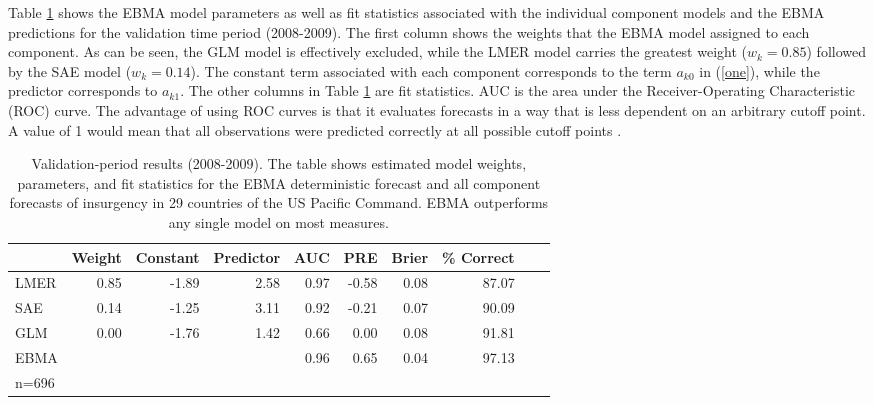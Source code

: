 \documentclass[12pt,fullpage,endnotes]{article}
\begin{document}
Table \ref{InSam1} shows the EBMA model parameters as well as fit
statistics associated with the individual component models and the
EBMA predictions for the validation time period (2008-2009). The first
column shows the weights that the EBMA model assigned to each
component. As can be seen, the GLM model is effectively excluded,
while the LMER model carries the greatest weight ($w_k=0.85$)
followed by the SAE model ($w_k = 0.14$).  The constant term
associated with each component corresponds to the term $a_{k0}$ in
(\ref{one}), while the predictor corresponds to $a_{k1}$.  The other
columns in Table \ref{InSam1} are fit statistics.  AUC is the area
under the Receiver-Operating Characteristic (ROC) curve. The advantage
of using ROC curves is that it evaluates forecasts in a way that is
less dependent on an arbitrary cutoff point.  A value of 1 would mean
that all observations were predicted correctly at all possible cutoff
points \citep{King:Zeng:2001}.

\begin{table}[h!]
\small
\begin{center}
  \caption{\footnotesize Validation-period results (2008-2009).  The
    table shows estimated model weights, parameters, and fit
    statistics for the EBMA deterministic forecast and all component
    forecasts of insurgency in 29 countries of the US Pacific Command.  EBMA
    outperforms any single model on most measures.}\label{InSam1}
\begin{tabular}{lrrrrrrrrr}
  \toprule
 & Weight & Constant & Predictor & AUC & PRE & Brier & \% Correct \\ 
  \midrule
LMER & 0.85 & -1.89 & 2.58 & 0.97 & -0.58 & 0.08 & 87.07 \\
   SAE & 0.14 & -1.25 & 3.11 & 0.92 & -0.21 & 0.07 & 90.09\\
 GLM & 0.00 & -1.76 & 1.42 & 0.66 & 0.00 & 0.08 & 91.81 \\
  EBMA &  &  &  & 0.96 & 0.65 & 0.04 & 97.13 \\   
\bottomrule
n=696\\
\end{tabular}
\end{center}
\end{table}
  
\end{document}
